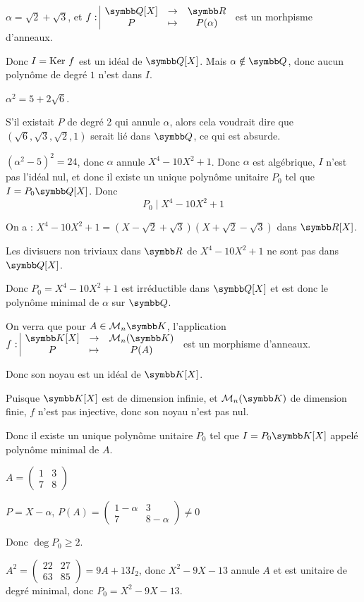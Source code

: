 \begin{exemple}
    $\alpha = \sqrt 2 + \sqrt 3$, et $\fonction f {\Q[X]} \R P {P(\alpha)}$ est un morhpisme d'anneaux.

    Donc $I = \operatorname{Ker} \, f$ est un idéal de $\Q[X]$. Mais $\alpha \notin \Q$, donc aucun 
    polynôme de degré $1$ n'est dans $I$.

    $\alpha^2 = 5 + 2 \sqrt 6$. 

    S'il existait $P$ de degré 2 qui annule $\alpha$, alors cela voudrait dire que 
    $(\sqrt 6, \sqrt 3, \sqrt 2, 1)$ serait lié dans $\Q$, ce qui est absurde. 

    $(\alpha^2 - 5)^2 = 24$, donc $\alpha$ annule $X^4 - 10 X^2 + 1$. Donc $\alpha$ est algébrique, 
    $I$ n'est pas l'idéal nul, et donc il existe un unique polynôme unitaire $P_0$ tel que
    $I = P_0 \Q[X]$.
    Donc \[P_0 \mid X^4 - 10 X^2 + 1\]

    On a : $X^4 - 10 X^2 + 1 = (X - \sqrt 2 + \sqrt 3)(X + \sqrt 2 - \sqrt 3)$ dans $\R[X]$.

    Les divisuers non triviaux dans $\R$ de $X^4 - 10 X^2 + 1$ ne sont pas dans $\Q[X]$.

    Donc $P_0 = X^4 - 10 X^2 + 1$ est irréductible dans $\Q[X]$ et est donc le polynôme minimal de
    $\alpha$ sur $\Q$.
\end{exemple}

\begin{exemple}
    On verra que pour $A \in \mathcal M_n{\K}$, l'application $\fonction f {\K[X]}{\mathcal M_n(\K)}{P}{P(A)}$ est un morphisme d'anneaux.

    Donc son noyau est un idéal de $\K[X]$.

    Puisque $\K[X]$ est de dimension infinie, et $\mathcal M_n(\K)$ de dimension finie,
    $f$ n'est pas injective, donc son noyau n'est pas nul.

    Donc il existe un unique polynôme unitaire $P_0$ tel que $I = P_0 \K[X]$ appelé polynôme
    minimal de $A$.

    \avspace $A = \begin{pmatrix}
        1 & 3 \\
        7 & 8
    \end{pmatrix}$

    $P = X - \alpha$, $P(A) = \begin{pmatrix}
        1 - \alpha & 3 \\
        7 & 8 - \alpha
    \end{pmatrix} \neq 0 $

    Donc $\deg P_0 \geqslant 2$.

    $A^2 = \begin{pmatrix}
        22 & 27 \\
        63 & 85
    \end{pmatrix} = 9A + 13 I_2$, donc $X^2 - 9X - 13$ annule $A$ et est unitaire de degré minimal, 
    donc $P_0 = X^2 - 9X - 13$.
\end{exemple}

